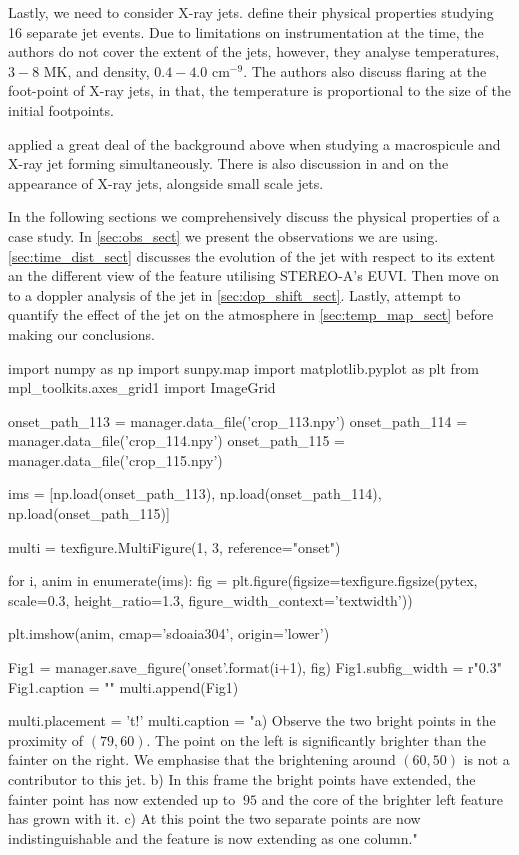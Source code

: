 \documentclass{emulateapj}
\begin{document}
Lastly, we need to consider X-ray jets.
\cite{Shimojo2000} define their physical properties studying 16 separate jet events.
Due to limitations on instrumentation at the time, the authors do not cover the extent of the jets, however, they analyse temperatures, $3 - 8$ MK, and density, $0.4 - 4.0$ cm$^{-9}$.
The authors also discuss flaring at the foot-point of X-ray jets, in that, the temperature is proportional to the size of the initial footpoints.

\cite{Kamio2010} applied a great deal of the background above when studying a macrospicule and X-ray jet forming simultaneously. There is also discussion in \cite{Pike_Harrison1997} and \cite{Kim2007} on the appearance of X-ray jets, alongside small scale jets.

In the following sections we comprehensively discuss the physical properties of a case study. In \ref{sec:obs_sect} we present the observations we are using. \ref{sec:time_dist_sect} discusses the evolution of the jet with respect to its extent an the different view of the feature utilising STEREO-A's EUVI. Then move on to a doppler analysis of the jet in \ref{sec:dop_shift_sect}. Lastly, attempt to quantify the effect of the jet on the atmosphere in \ref{sec:temp_map_sect} before making our conclusions.

\begin{pycode}[Onset]
import numpy as np
import sunpy.map
import matplotlib.pyplot as plt
from mpl_toolkits.axes_grid1 import ImageGrid

onset_path_113 = manager.data_file('crop_113.npy')
onset_path_114 = manager.data_file('crop_114.npy')
onset_path_115 = manager.data_file('crop_115.npy')

ims = [np.load(onset_path_113), np.load(onset_path_114), np.load(onset_path_115)]


multi = texfigure.MultiFigure(1, 3, reference="onset")

for i, anim in enumerate(ims):
    fig = plt.figure(figsize=texfigure.figsize(pytex, scale=0.3, height_ratio=1.3, figure_width_context='textwidth'))

    plt.imshow(anim, cmap='sdoaia304', origin='lower')

    Fig1 = manager.save_figure('onset{}'.format(i+1), fig)
    Fig1.subfig_width = r"0.3\textwidth"
    Fig1.caption = ""
    multi.append(Fig1)

multi.placement = 't!'
multi.caption = "a) Observe the two bright points in the proximity of $(79, 60)$. The point on the left is significantly brighter than the fainter on the right. We emphasise that the brightening around $(60, 50)$ is not a contributor to this jet. b) In this frame the bright points have extended, the fainter point has now extended up to $~95$ and the core of the brighter left feature has grown with it. c) At this point the two separate points are now indistinguishable and the feature is now extending as one column."
\end{pycode}
\end{document}
